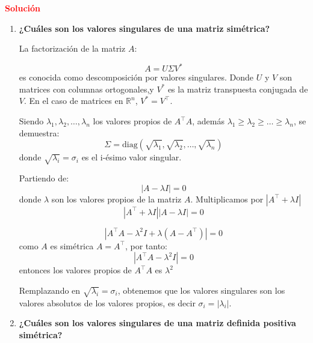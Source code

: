 \documentclass[12pt]{article}
\begin{document}
\noindent \textcolor{red}{\bf Solución}\\
\begin{enumerate}

\item \textbf{¿Cuáles son los valores singulares de una matriz simétrica?}

La factorización de la matriz $A$:

\begin{equation}
    A = U \Sigma V^*  
\end{equation}
es conocida como descomposición por valores singulares. Donde $U$ y $V$ son matrices con columnas ortogonales,y $V^*$ es la matriz transpuesta conjugada de $V$. En el caso de matrices en $\mathbb{R}^n$, $V^*=V^\intercal$.

Siendo $\lambda_1, \lambda_2, \dots, \lambda_n$ los valores propios de $A^\intercal A$, además $\lambda_1 \geq \lambda_2 \geq \dots \geq \lambda_n$, se demuestra:
\begin{equation}
    \Sigma = \mathrm{diag}( \sqrt{\lambda_1} , \sqrt{\lambda_2}, \dots, \sqrt{\lambda_n}) 
\end{equation}
donde $\sqrt{\lambda_i}=\sigma_i$ es el i-ésimo valor singular. 

Partiendo de:
\begin{equation}
    \left | A - \lambda I \right | = 0  
\end{equation}
donde $\lambda$ son los valores propios de la matriz $A$. Multiplicamos por $\left | A^\intercal + \lambda I \right |$
\begin{equation}
    \left | A^\intercal + \lambda I \right | \left | A - \lambda I \right |  = 0  
\end{equation}

\begin{equation}
    \left | A^\intercal A - \lambda^2 I + \lambda (A - A^\intercal ) \right |  = 0  
\end{equation}
como $A$ es simétrica $A = A^\intercal$, por tanto:
\begin{equation}
    \left | A^\intercal A - \lambda^2 I  \right |  = 0  
\end{equation}
entonces los valores propios de $A^\intercal A$ es $\lambda^2$

Remplazando en $\sqrt{\lambda_i}=\sigma_i$, obtenemos que los valores singulares son los valores absolutos de los valores propios, es decir $\sigma_i= \left | \lambda_i \right |$.


\item \textbf{¿Cuáles son los valores singulares de una matriz definida positiva simétrica?}


\end{enumerate}
\end{document}
